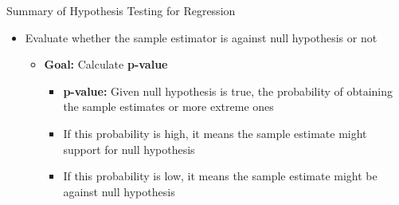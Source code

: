 \documentclass[dvipsnames,hyperref={pdfpagelabels=false}]{beamer}
\begin{document}
\begin{frame}{Summary of Hypothesis Testing for Regression}
	\begin{itemize} 
		
		
		
		\item[4.] Evaluate whether the sample estimator is against null hypothesis or not
		\begin{itemize} 
			\vspace{0.3cm}
			\item \textbf{Goal:} Calculate \textbf{p-value}
			\vspace{0.3cm}
			\begin{itemize} 
				\item \textbf{p-value:} Given null hypothesis is true, the probability of obtaining the sample estimates or more extreme ones
				\vspace{0.3cm}

					\item If this probability is high, it means the sample estimate might support for null hypothesis
					\vspace{0.3cm}
					\item If this probability is low, it means the sample estimate might be against null hypothesis		

				
			\end{itemize}
			
			
			
			
			
			
		\end{itemize}	
		
		
		
		
		
		
	\end{itemize}
\end{frame}
\end{document}
